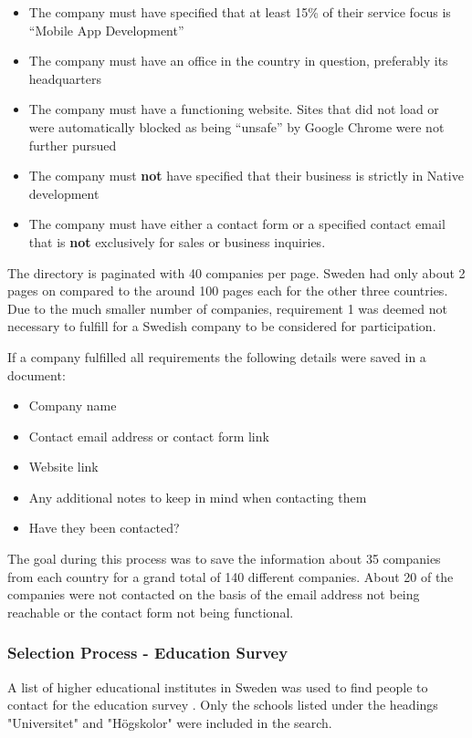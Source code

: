 \documentclass[a4paper,12pt]{article}
\begin{document}
\begin{itemize}
    \item The company must have specified that at least 15\% of their service focus is “Mobile App Development”
    \item The company must have an office in the country in question, preferably its headquarters
    \item The company must have a functioning website. Sites that did not load or were automatically blocked as being “unsafe” by Google Chrome were not further pursued
    \item The company must \textbf{not} have specified that their business is strictly in Native development
    \item The company must have either a contact form or a specified contact email that is \textbf{not} exclusively for sales or business inquiries.
\end{itemize}

The directory is paginated with 40 companies per page. Sweden had only about 2 pages on compared to the around 100 pages each for the other three countries. Due to the much smaller number of companies, requirement 1 was deemed not necessary to fulfill for a Swedish company to be considered for participation.

If a company fulfilled all requirements the following details were saved in a document:

\begin{itemize}
    \item Company name
    \item Contact email address or contact form link
    \item Website link
    \item Any additional notes to keep in mind when contacting them
    \item Have they been contacted?
\end{itemize}

The goal during this process was to save the information about 35 companies from each country for a grand total of 140 different companies. About 20 of the companies were not contacted on the basis of the email address not being reachable or the contact form not being functional. 

\subsubsection{Selection Process - Education Survey}
A list of higher educational institutes in Sweden was used to find people to contact for the education survey \cite{higher_edu_sweden}. Only the schools listed under the headings "Universitet" and "Högskolor" were included in the search.
\end{document}
